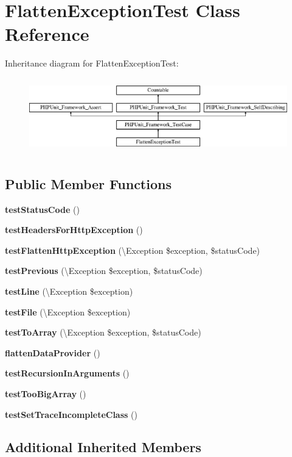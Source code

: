 \section{Flatten\+Exception\+Test Class Reference}
\label{class_symfony_1_1_component_1_1_debug_1_1_tests_1_1_exception_1_1_flatten_exception_test}
Inheritance diagram for Flatten\+Exception\+Test\+:\begin{figure}[H]
\begin{center}
\leavevmode
\includegraphics[height=3.303835cm]{class_symfony_1_1_component_1_1_debug_1_1_tests_1_1_exception_1_1_flatten_exception_test}
\end{center}
\end{figure}
\subsection*{Public Member Functions}
\begin{DoxyCompactItemize}
\item 
{\bf test\+Status\+Code} ()
\item 
{\bf test\+Headers\+For\+Http\+Exception} ()
\item 
{\bf test\+Flatten\+Http\+Exception} (\textbackslash{}Exception \$exception, \$status\+Code)
\item 
{\bf test\+Previous} (\textbackslash{}Exception \$exception, \$status\+Code)
\item 
{\bf test\+Line} (\textbackslash{}Exception \$exception)
\item 
{\bf test\+File} (\textbackslash{}Exception \$exception)
\item 
{\bf test\+To\+Array} (\textbackslash{}Exception \$exception, \$status\+Code)
\item 
{\bf flatten\+Data\+Provider} ()
\item 
{\bf test\+Recursion\+In\+Arguments} ()
\item 
{\bf test\+Too\+Big\+Array} ()
\item 
{\bf test\+Set\+Trace\+Incomplete\+Class} ()
\end{DoxyCompactItemize}
\subsection*{Additional Inherited Members}


